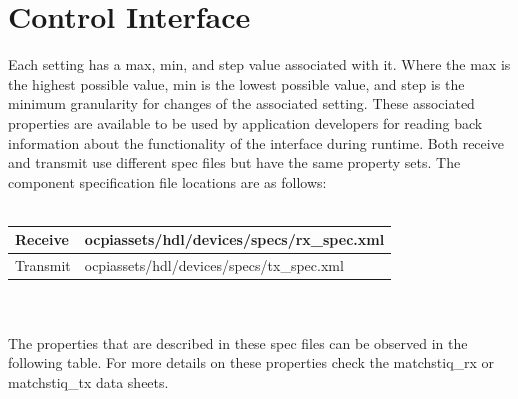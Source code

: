 \section{Control Interface}
Each setting has a max, min, and step value associated with it.  Where the max is the highest possible value, min is the lowest possible value, and step is the minimum granularity for changes of the associated setting.  These associated properties are available to be used by application developers for reading back information about the functionality of the interface during runtime.  Both receive and transmit use different spec files but have the same property sets. The component specification file locations are as follows: \\ \\
   \begin{tabular}{|p{2cm}|p{7cm}|}
      \hline
      Receive & ocpiassets/hdl/devices/specs/rx\_spec.xml \\
      \hline
      Transmit & ocpiassets/hdl/devices/specs/tx\_spec.xml  \\
      \hline
   \end{tabular}
   \\ \medskip \\
The properties that are described in these spec files can be observed in the following table.  For more details on these properties check the matchstiq\_rx or matchstiq\_tx data sheets. \\ \\
